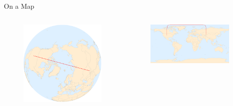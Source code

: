 \documentclass[UKenglish]{beamer}
\begin{document}
\begin{frame}{On a Map}
\vfill
\begin{columns}
    \begin{column}{0.4\textwidth}
        \begin{figure}[H]
        \centering
        \includegraphics[width=\textwidth]{Figures/earth_two_cities.pdf}
    \end{figure}
        \vspace*{2cm}
    \end{column}
    \begin{column}{0.54\textwidth}
    \vspace*{.75cm}
       \begin{figure}[H]
        \centering
        \includegraphics[width=\textwidth]{Figures/mercator_two_cities.pdf}
    \end{figure}
    \end{column}
\end{columns}
\end{frame}
\end{document}
